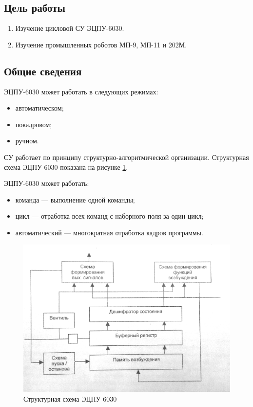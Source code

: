 \subsection*{Цель работы}

\begin{enumerate}
    \item Изучение цикловой СУ ЭЦПУ-6030.
    \item Изучение промышленных роботов МП-9, МП-11 и 202М.
\end{enumerate}

\subsection*{Общие сведения}

ЭЦПУ-6030 может работать в следующих режимах:

\begin{itemize}
    \item автоматическом;
    \item покадровом;
    \item ручном.
\end{itemize}

СУ работает по принципу структурно-алгоритмической организации. Структурная схема ЭЦПУ 6030 показана на рисунке \ref{fig:structure60}.

ЭЦПУ-6030 может работать:

\begin{itemize}
    \item команда --- выполнение одной команды;
    \item цикл --- отработка всех команд с наборного поля за один цикл;
    \item автоматический --- многократная отработка кадров программы.
\end{itemize}

\begin{figure}[ht]
    \includegraphics[width=1\linewidth]{Figures/structure60.png}
    \caption{Структурная схема ЭЦПУ 6030}
    \label{fig:structure60}
\end{figure}

